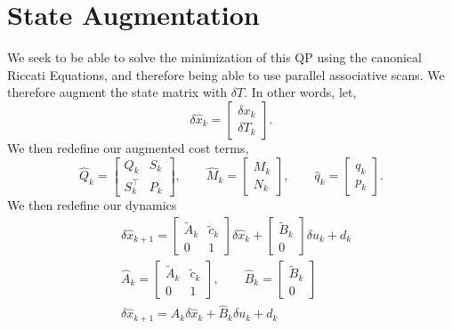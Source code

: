 \documentclass{article}
\begin{document}
\section{State Augmentation}
We seek to be able to solve the minimization of this QP using the canonical Riccati Equations, and therefore being able to use parallel associative scans. We therefore augment the state matrix with $\delta T$. In other words, let,
\begin{equation}
    \delta \hat x_k = \begin{bmatrix}
        \delta x_k \\
        \delta T_k
    \end{bmatrix}.
\end{equation}
We then redefine our augmented cost terms,
\begin{equation}
    \hat{Q}_k = \begin{bmatrix}
        Q_k & S_k \\
        S_k^\top & P_k
    \end{bmatrix},
    \qquad
    \hat M _k = \begin{bmatrix}
        M_k \\
        N_k
    \end{bmatrix},
    \qquad
    \hat{q}_k = \begin{bmatrix}
        q_k \\
        p_k
    \end{bmatrix}.
\end{equation}
We then redefine our dynamics
\begin{equation}
    \begin{aligned}
        & \delta \hat x_{k+1} = \begin{bmatrix}
            \tilde{A}_k & \tilde{c}_k \\
            0 & 1
        \end{bmatrix} \delta \hat{x}_{k}
        +
        \begin{bmatrix}
            \tilde{B}_k \\
            0
        \end{bmatrix} \delta u_k
        +
        d_k \\
        & \hat A_k = \begin{bmatrix}
            \tilde{A}_k & \tilde{c}_k \\
            0 & 1
        \end{bmatrix},
        \qquad
        \hat{B}_k = \begin{bmatrix}
            \tilde{B}_k \\
            0
        \end{bmatrix} \\
        & \delta \hat x_{k+1} = \hat{A}_k \delta \hat x_k + \hat B_k \delta u_k + d_k
    \end{aligned}
\end{equation}
\end{document}
